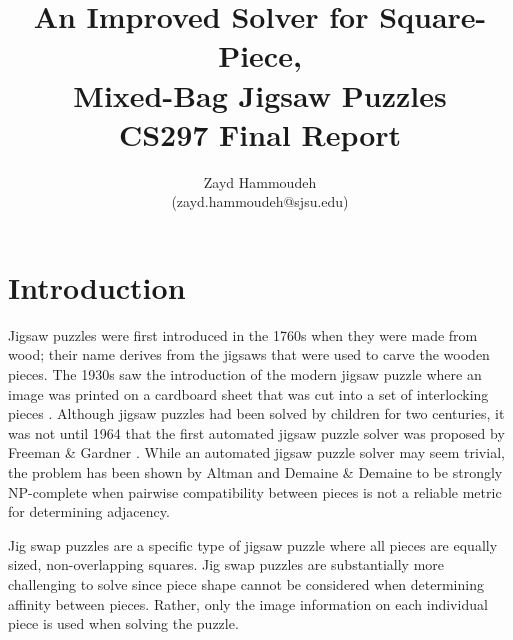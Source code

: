 \documentclass{report}
\title{   An Improved Solver for Square-Piece,
       \\ Mixed-Bag Jigsaw Puzzles
       \\[1in]
	   CS297 Final Report}
\author{
  Zayd Hammoudeh \\
  (zayd.hammoudeh@sjsu.edu)
  }
\begin{document}
\maketitle


\renewcommand{\contentsname}{Table of Contents} %
\tableofcontents{\protect\newpage}

\listoffigures
\newpage

\listoftables
\newpage
 

\renewcommand\thesection{\arabic{section}}






\section{Introduction}\label{sec:introduction}

Jigsaw puzzles were first introduced in the 1760s when they were made from wood; their name derives from the jigsaws that were used to carve the wooden pieces.   The 1930s saw the introduction of the modern jigsaw puzzle where an image was printed on a cardboard sheet that was cut into a set of interlocking pieces \cite{williams1990, williams2004}.  Although jigsaw puzzles had been solved by children for two centuries, it was not until 1964 that the first automated jigsaw puzzle solver was proposed by Freeman \& Gardner \cite{freeman1964}.  While an automated jigsaw puzzle solver may seem trivial, the problem has been shown by Altman \cite{altman1990} and Demaine \& Demaine \cite{demaine2007} to be strongly NP-complete when pairwise compatibility between pieces is not a reliable metric for determining adjacency.

Jig swap puzzles are a specific type of jigsaw puzzle where all pieces are equally sized, non-overlapping squares.  Jig swap puzzles are substantially more challenging to solve since piece shape cannot be considered when determining affinity between pieces.  Rather, only the image information on each individual piece is used when solving the puzzle.  
\end{document}

